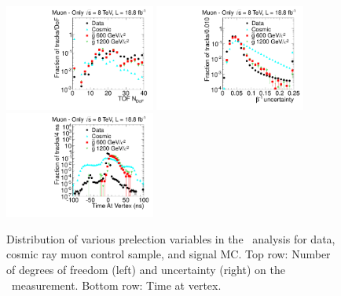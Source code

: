 \begin{figure}
\centering
  \includegraphics[clip=true, trim=0.0cm 0cm 2.8cm 0cm, width=0.44\textwidth]{figures/muonly/Selection_Comp_8TeV_Cosmic_nDof_BS}
  \includegraphics[clip=true, trim=0.0cm 0cm 2.8cm 0cm, width=0.44\textwidth]{figures/muonly/Selection_Comp_8TeV_Cosmic_TOFError_BS} \\
  \includegraphics[clip=true, trim=0.0cm 0cm 2.8cm 0cm, width=0.44\textwidth]{figures/muonly/Selection_Comp_8TeV_Cosmic_TimeAtIP_BS} \\
\caption[Distribution of number of degrees of freedom (left) and uncertainty (right) on the \invbeta\ measurement and time at vertex in 
the \muononly\ analysis for data, cosmic ray muon control sample, and signal MC.]
{Distribution of various prelection variables in the \muononly\ analysis for data, cosmic ray muon control sample, and signal MC.
Top row: Number of degrees of freedom (left) and uncertainty (right) on the \invbeta\ measurement.
Bottom row: Time at vertex.}
    \label{fig:MuOnlyPreselB}
\end{figure}

